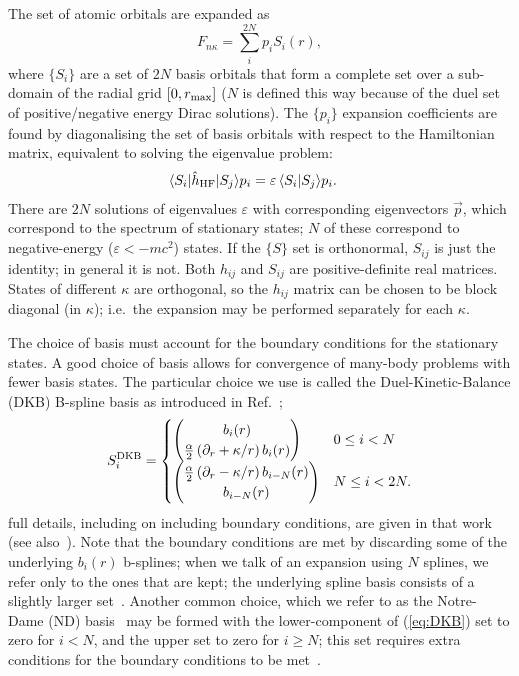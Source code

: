 \documentclass[10pt,twocolumn,a4paper]{article}%
\newcommand{\bra}[1]{\ensuremath{\langle #1|}}	%
\newcommand{\ket}[1]{\ensuremath{|#1\rangle}}	%
\newcommand{\braket}[1]{\ensuremath{\langle #1\rangle}}	%
\newcommand{\twocomp}[2]{\ensuremath{\begin{pmatrix}#1\\#2\end{pmatrix}}}	%
\newcommand{\be}{\begin{equation}}
\newcommand{\ee}{\end{equation}}
\def\en{\ensuremath{\varepsilon}}
\def\p{\ensuremath{\partial}}
\renewcommand{\k}{\ensuremath{\kappa}}
\begin{document}
The set of atomic orbitals are expanded as
\be
F_{n\k} = \sum_i^{2N} p_i S_i(r),
\ee
where $\{S_i\}$ are a set of $2N$ basis orbitals that form a complete set over a sub-domain of the radial grid $[0,r_{\rm max}]$ ($N$ is defined this way because of the duel set of positive/negative energy Dirac solutions).
The $\{p_i\}$ expansion coefficients are found by diagonalising the set of basis orbitals with respect to the Hamiltonian matrix, equivalent to solving the eigenvalue problem:
\begin{align}\label{eq:Hij-splines}
\bra{S_i}\hat h_{\rm HF}\ket{S_j} p_i &= \en\,\braket{S_i|S_j} p_i.
\end{align}
There are $2N$ solutions of eigenvalues $\en$ with corresponding eigenvectors $\vec{p}$, which correspond to the spectrum of stationary states; $N$ of these correspond to negative-energy ($\en<-mc^2$) states.
If the $\{S\}$ set is orthonormal, $S_{ij}$ is just the identity; in general it is not.
Both $h_{ij}$ and $S_{ij}$ are positive-definite real matrices.
States of different $\k$ are orthogonal, so the $h_{ij}$ matrix can be chosen to be block diagonal (in $\k$); i.e.\ the expansion may be performed separately for each $\kappa$. 







The choice of basis must account for the boundary conditions for the stationary states.
A good choice of basis allows for convergence of many-body problems with fewer basis states.
The particular choice we use is called the Duel-Kinetic-Balance (DKB) B-spline basis as introduced in Ref.~\cite{Beloy2008};
\be\label{eq:DKB}
S_i^{\rm DKB}= \begin{cases}
\twocomp{b_i(r)}{\frac{\alpha}{2}\left(\p_r+\kappa/r\right)b_i(r)}  &  0\leq i<N \\
\twocomp{\frac{\alpha}{2}\left(\p_r-\kappa/r\right)b_{i-N}(r)}{b_{i-N}(r)}   & N\leq i<2N.
\end{cases}
\ee
full details, including on including boundary conditions, 
are given in that work (see also~\cite{Johnson1988,AMBiT2018}).
Note that the boundary conditions are met by discarding some of the underlying $b_i(r)$ b-splines; when we talk of an expansion using $N$ splines, we refer only to the ones that are kept; the underlying spline basis consists of a slightly larger set~\cite{Beloy2008}.
Another common choice, which we refer to as the Notre-Dame (ND) basis~\cite{Johnson1988} may be formed with the lower-component of (\ref{eq:DKB}) set to zero for $i<N$, and the upper set to zero for $i\geq N$; this set requires extra conditions for the boundary conditions to be met~\cite{Johnson1988}.
\end{document}
